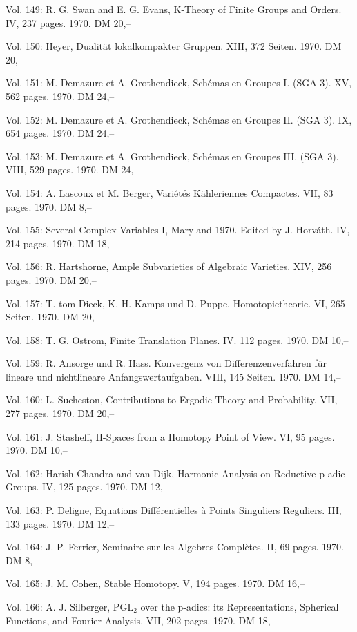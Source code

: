 Vol. 149: R. G. Swan and E. G. Evans, K-Theory of Finite Groups and Orders. IV, 237 pages. 1970. DM 20,--

Vol. 150: Heyer, Dualität lokalkompakter Gruppen. XIII, 372 Seiten. 1970. DM 20,--

Vol. 151: M. Demazure et A. Grothendieck, Schémas en Groupes I. (SGA 3). XV, 562 pages. 1970. DM 24,--

Vol. 152: M. Demazure et A. Grothendieck, Schémas en Groupes II. (SGA 3). IX, 654 pages. 1970. DM 24,--

Vol. 153: M. Demazure et A. Grothendieck, Schémas en Groupes III. (SGA 3). VIII, 529 pages. 1970. DM 24,--

Vol. 154: A. Lascoux et M. Berger, Variétés Kähleriennes Compactes. VII, 83 pages. 1970. DM 8,--

Vol. 155: Several Complex Variables I, Maryland 1970. Edited by J. Horváth. IV, 214 pages. 1970. DM 18,--

Vol. 156: R. Hartshorne, Ample Subvarieties of Algebraic Varieties. XIV, 256 pages. 1970. DM 20,--

Vol. 157: T. tom Dieck, K. H. Kamps und D. Puppe, Homotopietheorie. VI, 265 Seiten. 1970. DM 20,--

Vol. 158: T. G. Ostrom, Finite Translation Planes. IV. 112 pages. 1970. DM 10,--

Vol. 159: R. Ansorge und R. Hass. Konvergenz von Differenzenverfahren für lineare und nichtlineare Anfangswertaufgaben. VIII, 145 Seiten. 1970. DM 14,--

Vol. 160: L. Sucheston, Contributions to Ergodic Theory and Probability. VII, 277 pages. 1970. DM 20,--

Vol. 161: J. Stasheff, H-Spaces from a Homotopy Point of View. VI, 95 pages. 1970. DM 10,--

Vol. 162: Harish-Chandra and van Dijk, Harmonic Analysis on Reductive p-adic Groups. IV, 125 pages. 1970. DM 12,--

Vol. 163: P. Deligne, Equations Différentielles à Points Singuliers Reguliers. III, 133 pages. 1970. DM 12,--

Vol. 164: J. P. Ferrier, Seminaire sur les Algebres Complètes. II, 69 pages. 1970. DM 8,--

Vol. 165: J. M. Cohen, Stable Homotopy. V, 194 pages. 1970. DM 16,--

Vol. 166: A. J. Silberger, \(\mathrm{PGL}_2\) over the p-adics: its Representations, Spherical Functions, and Fourier Analysis. VII, 202 pages. 1970. DM 18,--

